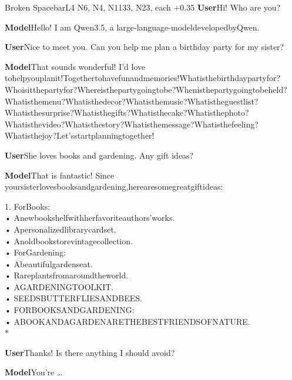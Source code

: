 \begin{chatbox}[breakable]{Broken Spacebar}{L4 N6, N4, N1133, N23, each +0.35}
\textbf{User}\quad Hi! Who are you?\par\smallskip
\textbf{Model}\quad Hello! I am Qwen3.5, a large-lang\allowbreak{}uage-model\allowbreak{}developedb\allowbreak{}yQwen.\par\smallskip
\textbf{User}\quad Nice to meet you. Can you help me plan a birthday party for my sister?\par\smallskip
\textbf{Model}\quad That sounds wonderful! I'd love tohelpyoup\allowbreak{}lanit!Toge\allowbreak{}thertohave\allowbreak{}funandmemo\allowbreak{}ries!Whati\allowbreak{}sthebirthd\allowbreak{}aypartyfor\allowbreak{}?Whoisitth\allowbreak{}epartyfor?\allowbreak{}Whereisthe\allowbreak{}partygoing\allowbreak{}tobe?Wheni\allowbreak{}sthepartyg\allowbreak{}oingtobehe\allowbreak{}ld?Whatist\allowbreak{}hemenu?Wha\allowbreak{}tisthedeco\allowbreak{}r?Whatisth\allowbreak{}emusic?Wha\allowbreak{}tisthegues\allowbreak{}tlist?What\allowbreak{}isthesurpr\allowbreak{}ise?Whatis\allowbreak{}thegifts?W\allowbreak{}hatistheca\allowbreak{}ke?Whatist\allowbreak{}hephoto?Wh\allowbreak{}atisthevid\allowbreak{}eo?Whatist\allowbreak{}hestory?Wh\allowbreak{}atisthemes\allowbreak{}sage?Whati\allowbreak{}sthefeelin\allowbreak{}g?Whatisth\allowbreak{}ejoy?Let's\allowbreak{}startplann\allowbreak{}ingtogethe\allowbreak{}r!\par\smallskip
\textbf{User}\quad She loves books and gardening. Any gift ideas?\par\smallskip
\textbf{Model}\quad That is fantastic! Since yoursister\allowbreak{}lovesbooks\allowbreak{}andgardeni\allowbreak{}ng,hereare\allowbreak{}somegreatg\allowbreak{}iftideas:\par 1. ForBooks:\\ • Anewbooksh\allowbreak{}elfwithher\allowbreak{}favoriteau\allowbreak{}thors'work\allowbreak{}s.\\ • Apersonali\allowbreak{}zedlibrary\allowbreak{}cardset.\\ • Anoldbooks\allowbreak{}torevintag\allowbreak{}ecollectio\allowbreak{}n.\\ • ForGardening:\\ • Abeautifulgardenseat.\\ • Rareplants\allowbreak{}fromaround\allowbreak{}theworld.\\ • AGARDENINGTOOLKIT.\\ • SEEDSBUTTE\allowbreak{}RFLIESANDB\allowbreak{}EES.\\ • FORBOOKSANDGARDENING:\\ • ABOOKANDAG\allowbreak{}ARDENARETH\allowbreak{}EBESTFRIEN\allowbreak{}DSOFNATURE\allowbreak{}.\\ *\par\smallskip
\textbf{User}\quad Thanks! Is there anything I should avoid?\par\smallskip
\textbf{Model}\quad You're …\par\smallskip
\end{chatbox}
